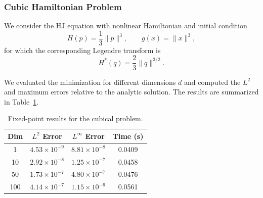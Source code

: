 \documentclass[review,hidelinks,onefignum,onetabnum]{siamart250106}
\begin{document}
\begin{table}[t]
\centering
\caption{Fixed-point results for the LQR control problem with two independent random realizations of \(Q\) and \(R\). Errors are measured against the analytic solution.}
\label{tab:lqr_results}
\end{table}

\subsubsection{Cubic Hamiltonian Problem}
We consider the HJ equation with nonlinear Hamiltonian and initial condition
\[
H(p) = \frac{1}{3} \|p\|^3, \qquad g(x) =\| x\|^3,
\]
for which the corresponding Legendre transform is
\[
H^*(q) = \frac{2}{3} \|q\|^{3/2}.
\]

We evaluated the minimization for different dimensions \(d\) and computed the $L^2$ and maximum errors relative to the analytic solution. The results are summarized in Table~\ref{tab:hopf_lax_results}.

\begin{table}[t]
\centering
\caption{Fixed-point results for the cubical problem.}
\label{tab:hopf_lax_results}
\begin{tabular}{c|c|c|c}
\hline
\textbf{Dim} & \textbf{$L^2$ Error} & \textbf{$L^\infty$ Error} & \textbf{Time (s)}\\
\hline
1   & $4.53 \times 10^{-9}$ & $8.81 \times 10^{-8}$ & 0.0409\\
10  & $2.92 \times 10^{-8}$ & $1.25 \times 10^{-7}$ & 0.0458\\
50  & $1.73 \times 10^{-7}$ & $4.80 \times 10^{-7}$ & 0.0476\\
100 & $4.14 \times 10^{-7}$ & $1.15 \times 10^{-6}$ & 0.0561\\
\hline
\end{tabular}
\end{table}
\end{document}
